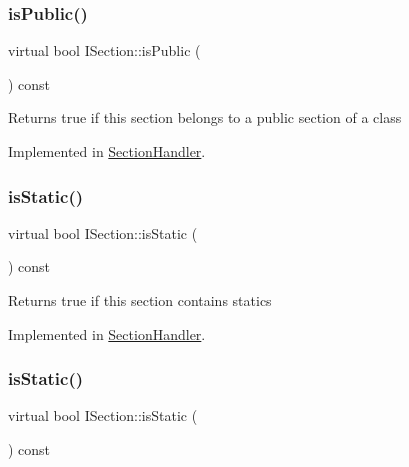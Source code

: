 \subsubsection{\texorpdfstring{isPublic()}{isPublic()}\hspace{0.1cm}{\footnotesize\ttfamily [2/2]}}
{\footnotesize\ttfamily virtual bool I\+Section\+::is\+Public (\begin{DoxyParamCaption}{ }\end{DoxyParamCaption}) const\hspace{0.3cm}{\ttfamily [pure virtual]}}

Returns {\ttfamily true} if this section belongs to a public section of a class 

Implemented in \mbox{\hyperlink{class_section_handler_aa6e571779cffbb8337fcbc041d486f63}{Section\+Handler}}.

\mbox{\label{class_i_section_a8fb73cfd6c2d057b32ce07a89700ecef}} 
\subsubsection{\texorpdfstring{isStatic()}{isStatic()}\hspace{0.1cm}{\footnotesize\ttfamily [1/2]}}
{\footnotesize\ttfamily virtual bool I\+Section\+::is\+Static (\begin{DoxyParamCaption}{ }\end{DoxyParamCaption}) const\hspace{0.3cm}{\ttfamily [pure virtual]}}

Returns {\ttfamily true} if this section contains statics 

Implemented in \mbox{\hyperlink{class_section_handler_a35d5f2bf1c1d2419934e50e370bd5088}{Section\+Handler}}.

\mbox{\label{class_i_section_a8fb73cfd6c2d057b32ce07a89700ecef}} 
\subsubsection{\texorpdfstring{isStatic()}{isStatic()}\hspace{0.1cm}{\footnotesize\ttfamily [2/2]}}
{\footnotesize\ttfamily virtual bool I\+Section\+::is\+Static (\begin{DoxyParamCaption}{ }\end{DoxyParamCaption}) const\hspace{0.3cm}{\ttfamily [pure virtual]}}

